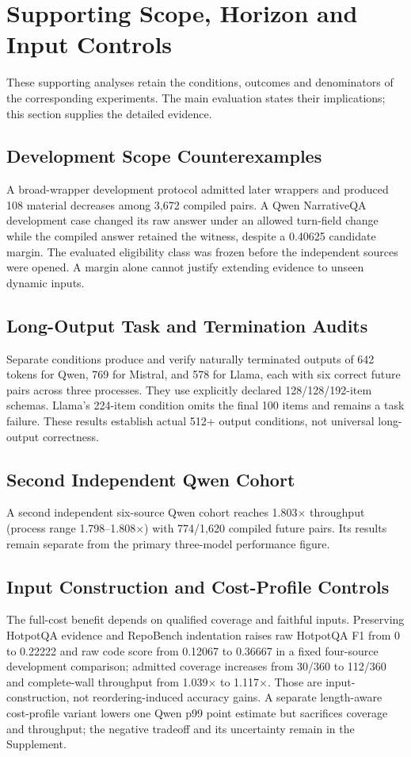 \section{Supporting Scope, Horizon and Input Controls}
\label{sec:s-supporting-audits}
These supporting analyses retain the conditions, outcomes and denominators of the corresponding experiments. The main evaluation states their implications; this section supplies the detailed evidence.

\subsection{Development Scope Counterexamples}
\label{sec:s-development-scope}
A broad-wrapper development protocol admitted later wrappers and produced 108 material decreases among 3,672 compiled pairs. A Qwen NarrativeQA development case changed its raw answer under an allowed turn-field change while the compiled answer retained the witness, despite a 0.40625 candidate margin. The evaluated eligibility class was frozen before the independent sources were opened. A margin alone cannot justify extending evidence to unseen dynamic inputs.

\subsection{Long-Output Task and Termination Audits}
\label{sec:s-output-horizon}
Separate conditions produce and verify naturally terminated outputs of 642 tokens for Qwen, 769 for Mistral, and 578 for Llama, each with six correct future pairs across three processes. They use explicitly declared 128/128/192-item schemas. Llama's 224-item condition omits the final 100 items and remains a task failure. These results establish actual 512+ output conditions, not universal long-output correctness.

\subsection{Second Independent Qwen Cohort}
\label{sec:s-second-qwen}
A second independent six-source Qwen cohort reaches 1.803$\times$ throughput (process range 1.798--1.808$\times$) with 774/1,620 compiled future pairs. Its results remain separate from the primary three-model performance figure.

\subsection{Input Construction and Cost-Profile Controls}
\label{sec:s-input-cost-controls}
The full-cost benefit depends on qualified coverage and faithful inputs. Preserving HotpotQA evidence and RepoBench indentation raises raw HotpotQA F1 from 0 to 0.22222 and raw code score from 0.12067 to 0.36667 in a fixed four-source development comparison; admitted coverage increases from 30/360 to 112/360 and complete-wall throughput from 1.039$\times$ to 1.117$\times$. Those are input-construction, not reordering-induced accuracy gains. A separate length-aware cost-profile variant lowers one Qwen p99 point estimate but sacrifices coverage and throughput; the negative tradeoff and its uncertainty remain in the Supplement.

